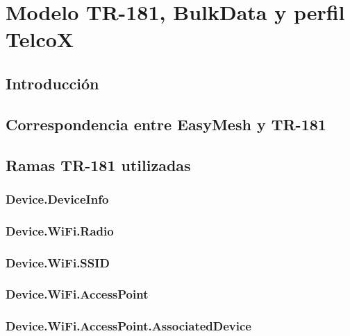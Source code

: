 %
%

\chapter{Modelo TR-181, BulkData y perfil TelcoX}
\label{cha:modelo-tr181-bulkdata-telcox}

\section{Introducción}
\label{sec:introduccion-modelo-tr181-bulkdata-telcox}


\section{Correspondencia entre EasyMesh y TR-181}
\label{sec:correspondencia-easymesh-tr181}


\section{Ramas TR-181 utilizadas}
\label{sec:ramas-tr181-utilizadas}

\subsection{Device.DeviceInfo}
\label{subsec:device-deviceinfo}

\subsection{Device.WiFi.Radio}
\label{subsec:device-wifi-radio}

\subsection{Device.WiFi.SSID}
\label{subsec:device-wifi-ssid}

\subsection{Device.WiFi.AccessPoint}
\label{subsec:device-wifi-accesspoint}

\subsection{Device.WiFi.AccessPoint.AssociatedDevice}
\label{subsec:device-wifi-accesspoint-associateddevice}

